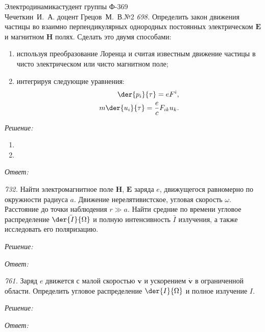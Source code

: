 




\newcommand{\rot}{\mathrm{rot\,}}
\renewcommand{\vec}[1]{\mathbf{#1}}
\renewcommand{\mid}[1]{\bar{#1}}


{Электродинамика}{студент группы Ф-369\\Чечеткин~И.~А.}
{доцент Грецов~М.~В.}{№2}
\emph{698.} Определить закон движения частицы во взаимно перпендикулярных
однородных постоянных электрическом \( \vec{E} \) и магнитном \( \vec{H} \)
полях. Сделать это двумя способами:
\vspace*{-1em}
\begin{enumerate}\itemsep-.5em
    \item используя преобразование Лоренца и считая известным движение частицы в
    чисто электрическом или чисто магнитном поле;
    \item интегрируя следующие уравнения:
    \begin{align*}
        \der{p_i}{\tau} = eF^i, \\
        m\der{u_i}{\tau} = \frac{e}{c}F_{ik}u_k.
    \end{align*}
\end{enumerate}

\vspace*{2em}
\emph{Решение:}
\begin{enumerate}
    \item
    \item
\end{enumerate}
\vspace*{2em}        
\emph{Ответ:}
\newpage

\emph{732.} Найти электромагнитное поле \( \vec{H} \), \( \vec{E} \) заряда
\( e \), движущегося равномерно по окружности радиуса \( a \). Движение
нерелятивистское, угловая скорость \( \omega \). Расстояние до точки наблюдения
\( r \gg a \). Найти средние по времени угловое распределение \( \mid{\der{I}
{\Omega}} \) и полную интенсивность \( \mid{I} \) излучения, а также исследовать
его поляризацию.

\vspace*{2em}
\emph{Решение:}

\vspace*{2em}
\emph{Ответ:}
\newpage

\emph{761.} Заряд \( e \) движется с малой скоростью \( \vec{v} \) и ускорением
\( \vec{\dot{v}} \) в ограниченной области.  Определить угловое распределение
\( \der{I}{\Omega} \) и полное излучение \( I \).

\vspace*{2em}
\emph{Решение:}

\vspace*{2em}
\emph{Ответ:}

